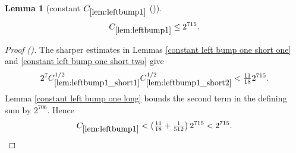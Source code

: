 \documentclass[12pt,reqno]{amsart}
\newcommand{\auto}{{({\tiny\faCar})}}
\theoremstyle{plain}
\newtheorem{lemma}[theorem]{Lemma}
\numberwithin{equation}{section}
\theoremstyle{remark}
\newcommand{\using}[1]{}
\begin{document}
\begin{lemma}[constant $C_{\ref{lem:leftbump1}}$ \auto]\label{constant left bump one}\using{constant left bump one short one}\using{constant left bump one short two}\using{lem:leftbump1_short1}\using{lem:leftbump1_short2}\using{constant left bump one long}\using{lem:leftbump1}\using{lem:smoothingdecomp}\using{lem:norm_A_sum_le_sum}\using{lem:mainbump1}\using{lem:mainbump2}\using{lem:leftbump}\using{constant main bump one}\using{constant main bump two}\using{constant left bump}\using{thm:nct main real}
\begin{equation}\label{constant left bump one bound}
C_{\ref{lem:leftbump1}}\le2^{715}.
\end{equation}
\end{lemma}
\begin{proof}[Proof \auto]
The sharper estimates in Lemmas \ref{constant left bump one short one} and \ref{constant left bump one short two} give
\[
2^7C_{\ref{lem:leftbump1_short1}}^{1/2}C_{\ref{lem:leftbump1_short2}}^{1/2}
<\tfrac{11}{18}2^{715}.
\]
Lemma \ref{constant left bump one long} bounds the second term in the defining sum by $2^{706}$. Hence
\[
C_{\ref{lem:leftbump1}}
<\left(\tfrac{11}{18}+\tfrac1{512}\right)2^{715}<2^{715}.
\]
\end{proof}
\end{document}
